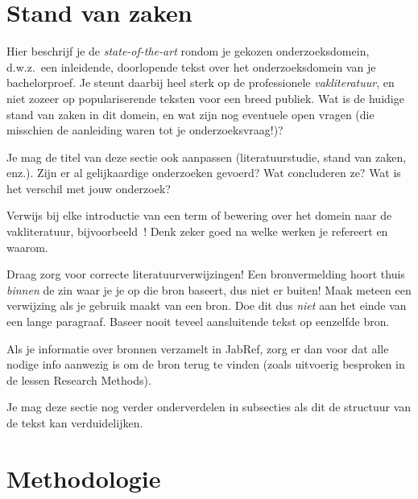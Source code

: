 
\section{Stand van zaken}%
\label{sec:stand van zaken}

Hier beschrijf je de \emph{state-of-the-art} rondom je gekozen onderzoeksdomein, d.w.z.\ een inleidende, doorlopende tekst over het onderzoeksdomein van je bachelorproef. Je steunt daarbij heel sterk op de professionele \emph{vakliteratuur}, en niet zozeer op populariserende teksten voor een breed publiek. Wat is de huidige stand van zaken in dit domein, en wat zijn nog eventuele open vragen (die misschien de aanleiding waren tot je onderzoeksvraag!)?

Je mag de titel van deze sectie ook aanpassen (literatuurstudie, stand van zaken, enz.). Zijn er al gelijkaardige onderzoeken gevoerd? Wat concluderen ze? Wat is het verschil met jouw onderzoek?

Verwijs bij elke introductie van een term of bewering over het domein naar de vakliteratuur, bijvoorbeeld~\autocite{Hykes2015}! Denk zeker goed na welke werken je refereert en waarom.

Draag zorg voor correcte literatuurverwijzingen! Een bronvermelding hoort thuis \emph{binnen} de zin waar je je op die bron baseert, dus niet er buiten! Maak meteen een verwijzing als je gebruik maakt van een bron. Doe dit dus \emph{niet} aan het einde van een lange paragraaf. Baseer nooit teveel aansluitende tekst op eenzelfde bron.

Als je informatie over bronnen verzamelt in JabRef, zorg er dan voor dat alle nodige info aanwezig is om de bron terug te vinden (zoals uitvoerig besproken in de lessen Research Methods).


Je mag deze sectie nog verder onderverdelen in subsecties als dit de structuur van de tekst kan verduidelijken.

\section{Methodologie}%
\label{sec:methodologie}


